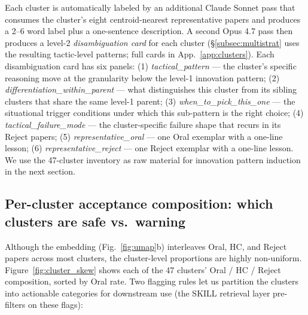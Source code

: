 \documentclass[10pt,a4paper]{article}
\begin{document}
Each cluster is automatically labeled by an additional Claude Sonnet pass that consumes the cluster's eight centroid-nearest representative papers and produces a 2--6 word label plus a one-sentence description. A second Opus 4.7 pass then produces a level-2 \emph{disambiguation card} for each cluster (\S\ref{subsec:multistrat} uses the resulting tactic-level patterns; full cards in App.~\ref{app:clusters}). Each disambiguation card has six panels: (1) \emph{tactical\_pattern} --- the cluster's specific reasoning move at the granularity below the level-1 innovation pattern; (2) \emph{differentiation\_within\_parent} --- what distinguishes this cluster from its sibling clusters that share the same level-1 parent; (3) \emph{when\_to\_pick\_this\_one} --- the situational trigger conditions under which this sub-pattern is the right choice; (4) \emph{tactical\_failure\_mode} --- the cluster-specific failure shape that recurs in its Reject papers; (5) \emph{representative\_oral} --- one Oral exemplar with a one-line lesson; (6) \emph{representative\_reject} --- one Reject exemplar with a one-line lesson. We use the 47-cluster inventory as raw material for innovation pattern induction in the next section.

\subsection{Per-cluster acceptance composition: which clusters are safe vs.\ warning}
\label{subsec:clusterskew}

Although the embedding (Fig.~\ref{fig:umap}b) interleaves Oral, HC, and Reject papers across most clusters, the cluster-level proportions are highly non-uniform. Figure~\ref{fig:cluster_skew} shows each of the 47 clusters' Oral / HC / Reject composition, sorted by Oral rate. Two flagging rules let us partition the clusters into actionable categories for downstream use (the SKILL retrieval layer pre-filters on these flags):
\end{document}
